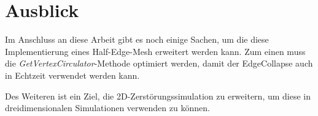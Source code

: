 \section{Ausblick}
Im Anschluss an diese Arbeit gibt es noch einige Sachen, um die diese Implementierung eines Half-Edge-Mesh erweitert werden kann. Zum einen muss die \textit{GetVertexCirculator}-Methode optimiert werden, damit der EdgeCollapse auch in Echtzeit verwendet werden kann. 

Des Weiteren ist ein Ziel, die 2D-Zerst\"orungssimulation zu erweitern, um diese in dreidimensionalen Simulationen verwenden zu k\"onnen.
